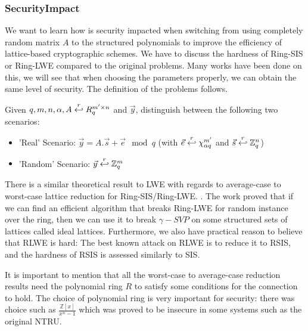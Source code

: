 \subsubsection{SecurityImpact}
\label{sec:securityImpact}
We want to learn how is security impacted when switching from using completely
random matrix $A$ to the structured polynomials to improve the efficiency of
lattice-based cryptographic schemes. We have to discuss the hardness of Ring-SIS
or Ring-LWE compared to the original problems. Many works have been done on
this, we will see that when choosing the parameters properly, we can obtain the
same level of security. The definition of the problems follows.
\begin{definition}
   Given
  $q, m, n, \alpha, A \stackrel{r}{\hookleftarrow} {R}_q^{m' \times n}$ and $\vec{y}$,
  distinguish between the following two scenarios:
  \begin{itemize}
  \item 'Real' Scenario: $\vec{y} = A.\vec{s} + \vec{e} \mod q$ (with
    $\vec{e} \stackrel{r}{\hookleftarrow} \chi_{\alpha q}^{m'}$ and
    $\vec{s} \stackrel{r}{\hookleftarrow} \mathbb{Z}_q^n$)
  \item 'Random' Scenario: $\vec{y} \stackrel{r}{\hookleftarrow} \mathbb{Z}_q^m$
  \end{itemize}
\end{definition}
There is a similar theoretical result to LWE with regards to average-case to
worst-case lattice reduction for Ring-SIS/Ring-LWE.
\cite{lyubashevsky2010ideal}. The work proved that if we can find an efficient
algorithm that breaks Ring-LWE for random instance over the ring, then we can
use it to break $\gamma-SVP$ on some structured sets of lattices called ideal
lattices. Furthermore, we also have practical reason to believe that RLWE is
hard: The best known attack on RLWE is to reduce it to RSIS, and the hardness of
RSIS is assessed similarly to SIS.

It is important to mention that all the worst-case to average-case reduction
results need the polynomial ring $R$ to satisfy some conditions for the
connection to hold. The choice of polynomial ring is very important for
security: there was choice such as $\frac{\mathbb{Z}[x]}{x^n - 1}$ which was
proved to be insecure in some systems such as the original NTRU.

